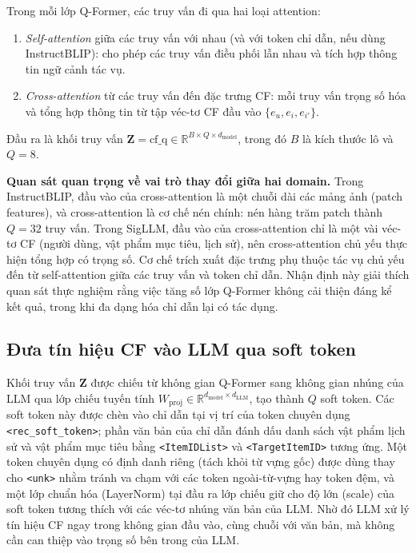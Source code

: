 Trong mỗi lớp Q-Former, các truy vấn đi qua hai loại attention:

\begin{enumerate}
    \item \textit{Self-attention} giữa các truy vấn với nhau (và với token chỉ dẫn, nếu
    dùng InstructBLIP): cho phép các truy vấn điều phối lẫn nhau và tích hợp thông tin
    ngữ cảnh tác vụ.

    \item \textit{Cross-attention} từ các truy vấn đến đặc trưng CF: mỗi truy vấn trọng
    số hóa và tổng hợp thông tin từ tập véc-tơ CF đầu vào $\{e_u, e_i, e_{i'}\}$.
\end{enumerate}

Đầu ra là khối truy vấn $\mathbf{Z} = \text{cf\_q} \in \mathbb{R}^{B \times Q \times
d_{\text{model}}}$, trong đó $B$ là kích thước lô và $Q = 8$.

\textbf{Quan sát quan trọng về vai trò thay đổi giữa hai domain.} Trong InstructBLIP,
đầu vào của cross-attention là một chuỗi dài các mảng ảnh (patch features), và
cross-attention là cơ chế nén chính: nén hàng trăm patch thành $Q = 32$ truy vấn. Trong
SigLLM, đầu vào của cross-attention chỉ là một vài véc-tơ CF (người dùng, vật phẩm mục
tiêu, lịch sử), nên cross-attention chủ yếu thực hiện tổng hợp có trọng số. Cơ chế trích
xuất đặc trưng phụ thuộc tác vụ chủ yếu đến từ self-attention giữa các truy vấn và token
chỉ dẫn. Nhận định này giải thích quan sát thực nghiệm rằng việc tăng số lớp Q-Former
không cải thiện đáng kể kết quả, trong khi đa dạng hóa chỉ dẫn lại có tác dụng.

\subsection{Đưa tín hiệu CF vào LLM qua soft token}
\label{ssec:hai-duong}

Khối truy vấn $\mathbf{Z}$ được chiếu từ không gian Q-Former sang không gian nhúng của LLM
qua lớp chiếu tuyến tính $W_{\text{proj}} \in \mathbb{R}^{d_{\text{model}} \times
d_{\text{LLM}}}$, tạo thành $Q$ soft token. Các soft token này được chèn vào chỉ dẫn tại
vị trí của token chuyên dụng \verb|<rec_soft_token>|; phần văn bản của chỉ dẫn đánh dấu
danh sách vật phẩm lịch sử và vật phẩm mục tiêu bằng \verb|<ItemIDList>| và
\verb|<TargetItemID>| tương ứng. Một token chuyên dụng có định danh riêng (tách khỏi từ
vựng gốc) được dùng thay cho \verb|<unk>| nhằm tránh va chạm với các token ngoài-từ-vựng
hay token đệm, và một lớp chuẩn hóa (LayerNorm) tại đầu ra lớp chiếu giữ cho độ lớn (scale)
của soft token tương thích với các véc-tơ nhúng văn bản của LLM. Nhờ đó LLM xử lý tín hiệu
CF ngay trong không gian đầu vào, cùng chuỗi với văn bản, mà không cần can thiệp vào trọng
số bên trong của LLM.

